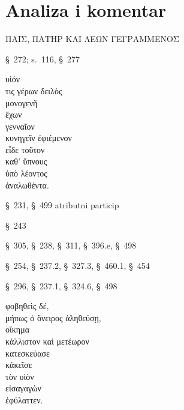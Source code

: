 \section*{Analiza i komentar}



{\large
\begin{greek}
\noindent ΠΑΙΣ, ΠΑΤΗΡ ΚΑΙ ΛΕΩΝ ΓΕΓΡΑΜΜΕΝΟΣ

\end{greek}
}

\begin{description}[noitemsep]
\item[ΓΕΓΡΑΜΜΕΝΟΣ] §~272; s.\ 116, §~277
\end{description}



{\large
\begin{greek}
\noindent υἱόν\\
τις γέρων δειλὸς \\
\tabto{2em} μονογενῆ \\
ἔχων \\
\tabto{2em} γενναῖον \\
\tabto{2em} κυνηγεῖν ἐφιέμενον \\
εἶδε τοῦτον \\
\tabto{2em} καθ' ὕπνους \\
\tabto{4em} ὑπὸ λέοντος \\
\tabto{2em} ἀναλωθέντα.\\

\end{greek}
}

\begin{description}[noitemsep]
\item[ἔχων] §~231, §~499 atributni particip
\item[κυνηγεῖν] §~243
\item[ἐφιέμενον] §~305, §~238, §~311, §~396.e, §~498
\item[εἶδε] §~254, §~237.2, §~327.3, §~460.1, §~454
\item[ἀναλωθέντα] §~296, §~237.1, §~324.6, §~498
\end{description}




{\large
\begin{greek}
\noindent φοβηθεὶς δέ, \\
\tabto{2em} μήπως ὁ ὄνειρος ἀληθεύσῃ, \\
οἴκημα \\
\tabto{2em} κάλλιστον καὶ μετέωρον \\
κατεσκεύασε \\
κἀκεῖσε \\
\tabto{4em} τὸν υἱὸν \\
\tabto{2em} εἰσαγαγὼν \\
ἐφύλαττεν.\\

\end{greek}
}

